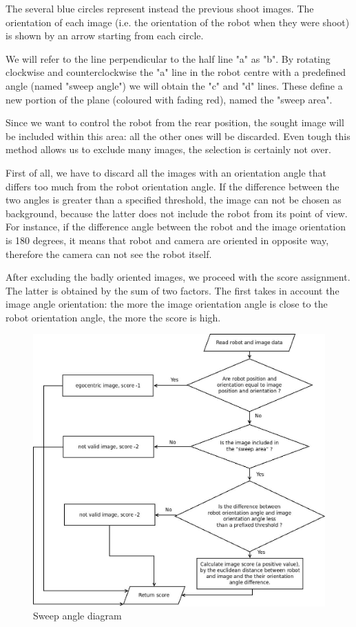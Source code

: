 %
The several blue circles represent instead the previous shoot images. The orientation of each
image (i.e. the orientation of the robot when they were shoot) is shown by an arrow starting from
each circle.
%

%
We will refer to the line perpendicular to the half line "a" as "b". By rotating clockwise and
counterclockwise the "a" line in the robot centre with a predefined angle (named "sweep angle")
we will obtain the "c" and "d" lines. These define a new portion of the plane (coloured with fading red),
named the "sweep area".
%

%
Since we want to control the robot from the rear position, the sought image will be included within
this area: all the other ones will be discarded. Even tough this method allows us to exclude many
images, the selection is certainly not over.
%

%
First of all, we have to discard all the images with an orientation angle that differs too much from the
robot orientation angle. If the difference between the two angles is greater than a specified threshold,
the image can not be chosen as background, because the latter does not include the robot from its point
of view. For instance, if the difference angle between the robot and the image orientation is 180 degrees,
it means that robot and camera are oriented in opposite way, therefore the camera can not see the robot
itself.
%

%
After excluding the badly oriented images, we proceed with the score assignment. The latter is obtained by
the sum of two factors. The first takes in account the image angle orientation: the more the image orientation
angle is close to the robot orientation angle, the more the score is high.
%
\begin{figure}[!h]
  \begin{center}
    \includegraphics[width=400pt]{img/sweep_angle_diagram.jpeg} 
    \caption{Sweep angle diagram}
    \label{fig:sweep_angle_diagram}
  \end{center}
\end{figure}

